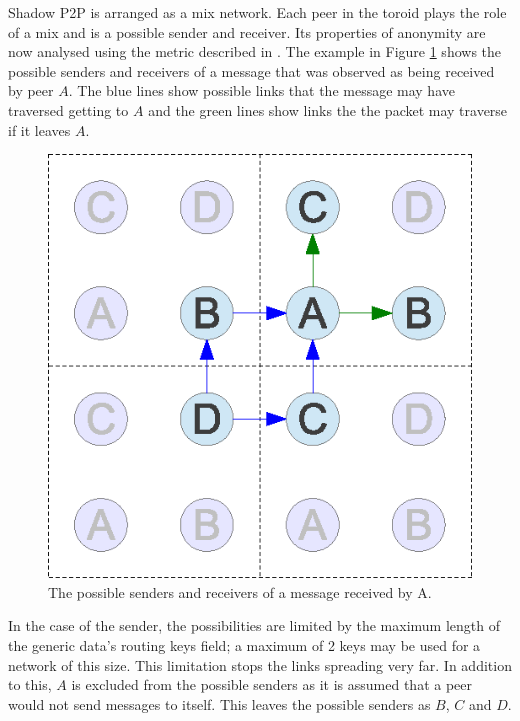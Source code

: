 \documentclass[ %
                    author={Luke Murray},
                supervisor={Dr. Simon Hollis},
                     title={Shadow Peer-to-Peer Networks},
                  subtitle={},
                    degree={MEng},
                      year={2013} ]{thesis}
\begin{document}
Shadow P2P is arranged as a mix network. Each peer in the toroid plays the role of a mix and is a possible sender and receiver. Its properties of anonymity are now analysed using the metric described in \cite{serjantov2003towards}. The example in Figure \ref{entropy_send_recv} shows the possible senders and receivers of a message that was observed as being received by peer $A$. The blue lines show possible links that the message may have traversed getting to $A$ and the green lines show links the the packet may traverse if it leaves $A$.

\begin{figure}[h]
    \centering
    \includegraphics{diagrams/mix_analysis2.eps}
    \caption{The possible senders and receivers of a message received by A.}
    \label{entropy_send_recv}
\end{figure}

In the case of the sender, the possibilities are limited by the maximum length of the generic data's routing keys field; a maximum of 2 keys may be used for a network of this size. This limitation stops the links spreading very far. In addition to this, $A$ is excluded from the possible senders as it is assumed that a peer would not send messages to itself. This leaves the possible senders as $B$, $C$ and $D$.
\end{document}
